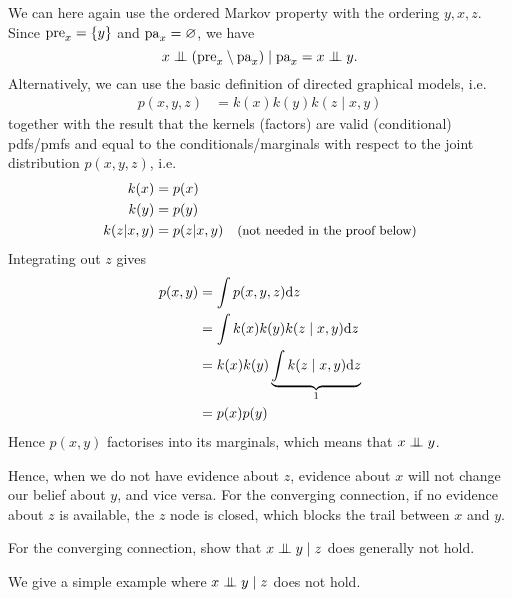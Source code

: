 \begin{exenumerate}
   \begin{solution}
     We can here again use the ordered Markov property with the
     ordering $y, x, z$. Since $\mathrm{pre}_x = \{y\}$ and $\mathrm{pa}_x =
     \varnothing$, we have
     \begin{equation}
       x \mathrel{\perp\mspace{-10mu}\perp} ( \mathrm{pre}_x \setminus \mathrm{pa}_x ) \mid \mathrm{pa}_x = x \mathrel{\perp\mspace{-10mu}\perp} y.
     \end{equation}
     Alternatively, we can use the basic definition of directed
     graphical models, i.e.\
     \begin{align}
       p(x,y,z) & = k(x) k(y) k(z \mid x, y)
     \end{align}
     together with the result that the kernels (factors) are valid
     (conditional) pdfs/pmfs and equal to the conditionals/marginals
     with respect to the joint distribution $p(x,y,z)$, i.e.\
     \begin{align}
       k(x) & = p(x)\\
       k(y) &= p(y) \\
       k(z | x, y) & = p(z|x,y) \quad \text{\small (not needed in the proof below)}
     \end{align}
     Integrating out $z$ gives
     \begin{align}
       p(x,y) & = \int p(x,y,z) \mathrm{d} z\\
       & =  \int  k(x) k(y) k(z \mid x, y) \mathrm{d} z\\
       & = k(x) k(y) \underbrace{\int k(z \mid x, y) \mathrm{d} z}_{1}\\
       & = p(x) p(y)
     \end{align}
     Hence $p(x,y)$ factorises into its marginals, which means that $x
     \mathrel{\perp\mspace{-10mu}\perp} y$.

     Hence, when we do not have evidence about $z$, evidence about $x$
     will not change our belief about $y$, and vice versa. For the
     converging connection, if no evidence about $z$ is available, the
     $z$ node is closed, which blocks the trail between $x$ and $y$.

   \end{solution}

 \item For the converging connection, show that $x \mathrel{\perp\mspace{-10mu}\perp} y \mid
   z$ does generally not hold.

   \begin{solution}
     We give a simple example where $x \mathrel{\perp\mspace{-10mu}\perp} y \mid
     z$ does not hold.
     

\end{solution}
\end{exenumerate}
